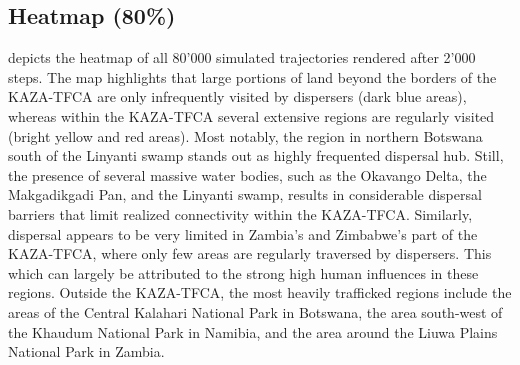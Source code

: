 \documentclass[abstract=on,10pt,a4paper,bibliography=totocnumbered]{article}
\begin{document}
\subsection{Heatmap (80\%)}
 depicts the heatmap of all 80'000 simulated trajectories rendered
after 2'000 steps. The map highlights that large portions of land beyond the
borders of the KAZA-TFCA are only infrequently visited by dispersers (dark blue
areas), whereas within the KAZA-TFCA several extensive regions are regularly
visited (bright yellow and red areas). Most notably, the region in northern
Botswana south of the Linyanti swamp stands out as highly frequented dispersal
hub. Still, the presence of several massive water bodies, such as the Okavango
Delta, the Makgadikgadi Pan, and the Linyanti swamp, results in considerable
dispersal barriers that limit realized connectivity within the KAZA-TFCA.
Similarly, dispersal appears to be very limited in Zambia's and Zimbabwe's part
of the KAZA-TFCA, where only few areas are regularly traversed by dispersers.
This which can largely be attributed to the strong high human influences in
these regions. Outside the KAZA-TFCA, the most heavily trafficked regions
include the areas of the Central Kalahari National Park in Botswana, the area
south-west of the Khaudum National Park in Namibia, and the area around the
Liuwa Plains National Park in Zambia.
\end{document}
